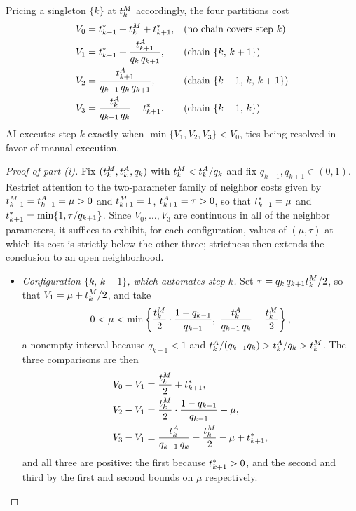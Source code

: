 Pricing a singleton $\{k\}$ at $t^{M}_{k}$ accordingly, the four partitions cost
\begin{align*}
V_0 &= t^*_{k-1} + t^{M}_{k} + t^*_{k+1}, && \text{(no chain covers step $k$)} \\
V_1 &= t^*_{k-1} + \frac{t^{A}_{k+1}}{q_k\, q_{k+1}}, && \text{(chain $\{k,\, k+1\}$)} \\
V_2 &= \frac{t^{A}_{k+1}}{q_{k-1}\, q_k\, q_{k+1}}, && \text{(chain $\{k-1,\, k,\, k+1\}$)} \\
V_3 &= \frac{t^{A}_{k}}{q_{k-1}\, q_k} + t^*_{k+1}. && \text{(chain $\{k-1,\, k\}$)}
\end{align*}
AI executes step $k$ exactly when $\min\{V_1, V_2, V_3\} < V_0$, ties being resolved in favor of manual execution.

\begin{proof}[Proof of part (i)]
Fix $(t^{M}_{k}, t^{A}_{k}, q_k)$ with $t^{M}_{k} < t^{A}_{k}/q_k$ and fix $q_{k-1}, q_{k+1} \in (0,1)$.
Restrict attention to the two-parameter family of neighbor costs given by $t^{M}_{k-1} = t^{A}_{k-1} = \mu > 0$ and $t^{M}_{k+1} = 1$, $t^{A}_{k+1} = \tau > 0$, so that $t^*_{k-1} = \mu$ and $t^*_{k+1} = \min\{1, \tau/q_{k+1}\}$.
Since $V_0, \dotsc, V_3$ are continuous in all of the neighbor parameters, it suffices to exhibit, for each configuration, values of $(\mu, \tau)$ at which its cost is strictly below the other three; strictness then extends the conclusion to an open neighborhood.

\begin{itemize}
\item \emph{Configuration $\{k,\, k+1\}$, which automates step $k$.}
Set $\tau = q_k\, q_{k+1} t^{M}_{k}/2$, so that $V_1 = \mu + t^{M}_{k}/2$, and take
\[ 0 < \mu < \min\left\{ \frac{\manualTime{k}}{2}\cdot\frac{1-q_{k-1}}{q_{k-1}},\ \frac{\AItime{k}}{q_{k-1}\, q_k} - \frac{\manualTime{k}}{2} \right\}, \]
a nonempty interval because $q_{k-1} < 1$ and $t^{A}_{k}/(q_{k-1} q_k) > t^{A}_{k}/q_k > t^{M}_{k}$.
The three comparisons are then
\begin{align*}
V_0 - V_1 &= \frac{t^{M}_{k}}{2} + t^*_{k+1}, \\
V_2 - V_1 &= \frac{t^{M}_{k}}{2}\cdot\frac{1-q_{k-1}}{q_{k-1}} - \mu, \\
V_3 - V_1 &= \frac{t^{A}_{k}}{q_{k-1}\, q_k} - \frac{t^{M}_{k}}{2} - \mu + t^*_{k+1},
\end{align*}
and all three are positive: the first because $t^*_{k+1} > 0$, and the second and third by the first and second bounds on $\mu$ respectively.


\end{itemize}
\end{proof}
